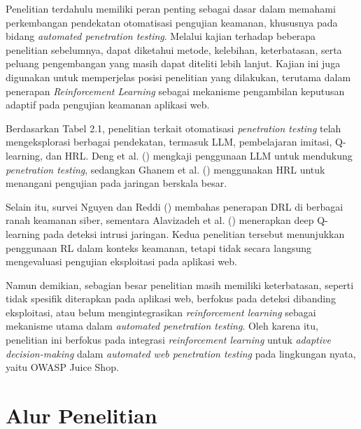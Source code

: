 Penelitian terdahulu memiliki peran penting sebagai dasar dalam memahami perkembangan pendekatan otomatisasi pengujian keamanan, khususnya pada bidang \textit{automated penetration testing}. Melalui kajian terhadap beberapa penelitian sebelumnya, dapat diketahui metode, kelebihan, keterbatasan, serta peluang pengembangan yang masih dapat diteliti lebih lanjut. Kajian ini juga digunakan untuk memperjelas posisi penelitian yang dilakukan, terutama dalam penerapan \textit{Reinforcement Learning} sebagai mekanisme pengambilan keputusan adaptif pada pengujian keamanan aplikasi web.

Berdasarkan Tabel 2.1, penelitian terkait otomatisasi \textit{penetration testing} telah mengeksplorasi berbagai pendekatan, termasuk LLM, pembelajaran imitasi, Q-learning, dan HRL. Deng et al. (\cite{deng2024pentestgpt}) mengkaji penggunaan LLM untuk mendukung \textit{penetration testing}, sedangkan Ghanem et al. (\cite{ghanem2023hrl}) menggunakan HRL untuk menangani pengujian pada jaringan berskala besar.

Selain itu, survei Nguyen dan Reddi (\cite{nguyen2023}) membahas penerapan DRL di berbagai ranah keamanan siber, sementara Alavizadeh et al. (\cite{alavizadeh2022}) menerapkan deep Q-learning pada deteksi intrusi jaringan. Kedua penelitian tersebut menunjukkan penggunaan RL dalam konteks keamanan, tetapi tidak secara langsung mengevaluasi pengujian eksploitasi pada aplikasi web.

Namun demikian, sebagian besar penelitian masih memiliki keterbatasan, seperti tidak spesifik diterapkan pada aplikasi web, berfokus pada deteksi dibanding eksploitasi, atau belum mengintegrasikan \textit{reinforcement learning} sebagai mekanisme utama dalam \textit{automated penetration testing}. Oleh karena itu, penelitian ini berfokus pada integrasi \textit{reinforcement learning} untuk \textit{adaptive decision-making} dalam \textit{automated web penetration testing} pada lingkungan nyata, yaitu OWASP Juice Shop.

\section{Alur Penelitian}


